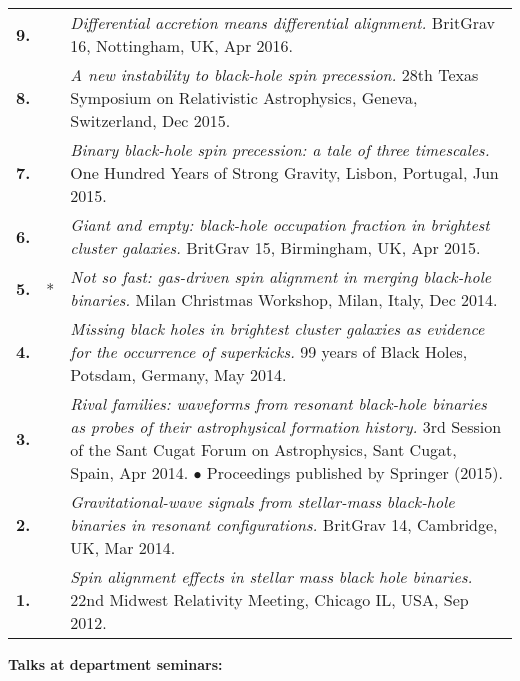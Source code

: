{\begin{longtable}{rp{0.3cm}p{15.8cm}}
%
\textbf{9.} &  & \textit{Differential accretion means differential alignment.}
\newline{}
BritGrav 16, Nottingham, UK, Apr 2016.
\vspace{0.05cm}\\
%
\textbf{8.} &  & \textit{A new instability to black-hole spin precession.}
\newline{}
28th Texas Symposium on Relativistic Astrophysics, Geneva, Switzerland, Dec 2015.
\vspace{0.05cm}\\
%
\textbf{7.} &  & \textit{Binary black-hole spin precession: a tale of three timescales.}
\newline{}
One Hundred Years of Strong Gravity, Lisbon, Portugal, Jun 2015.
\vspace{0.05cm}\\
%
\textbf{6.} &  & \textit{Giant and empty: black-hole occupation fraction in brightest cluster galaxies.}
\newline{}
BritGrav 15, Birmingham, UK, Apr 2015.
\vspace{0.05cm}\\
%
\textbf{5.} & * & \textit{Not so fast: gas-driven spin alignment in merging black-hole binaries.}
\newline{}
Milan Christmas Workshop, Milan, Italy, Dec 2014.
\vspace{0.05cm}\\
%
\textbf{4.} &  & \textit{Missing black holes in brightest cluster galaxies as evidence for the occurrence of superkicks.}
\newline{}
99 years of Black Holes, Potsdam, Germany, May 2014.
\vspace{0.05cm}\\
%
\textbf{3.} &  & \textit{Rival families: waveforms from resonant black-hole binaries as probes of their astrophysical formation history.}
\newline{}
3rd Session of the Sant Cugat Forum on Astrophysics, Sant Cugat, Spain, Apr 2014.
\newline{}
\textcolor{color1}{$\bullet$} Proceedings published by Springer (2015).
\vspace{0.05cm}\\
%
\textbf{2.} &  & \textit{Gravitational-wave signals from stellar-mass black-hole binaries in resonant configurations.}
\newline{}
BritGrav 14, Cambridge, UK, Mar 2014.
\vspace{0.05cm}\\
%
\textbf{1.} &  & \textit{Spin alignment effects in stellar mass black hole binaries.}
\newline{}
22nd Midwest Relativity Meeting, Chicago IL, USA, Sep 2012.
\vspace{0.05cm}\\
%
\end{longtable} }
\textcolor{color1}{\textbf{Talks at department seminars:}}
\vspace{-0.5cm}

